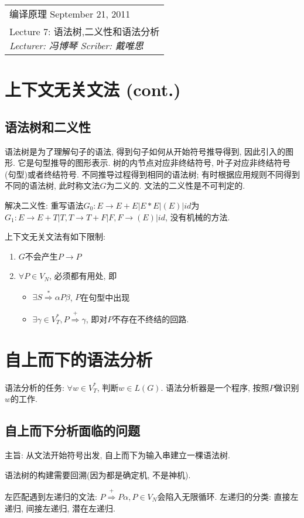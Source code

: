 \def\lecture{7}
\clearpage \noindent\begin{tabularx}{\linewidth}{|X|}
\hline \vskip -2mm
{\sf 编译原理} \hfill September 21, 2011 \\
{\centering \sf \large Lecture \lecture:
语法树,二义性和语法分析 \\ }
\textsl{Lecturer: 冯博琴 \hfill Scriber: 戴唯思}\\ \hline
\end{tabularx}
\setcounter{section}{0}
\renewcommand{\thepage}{\lecture -\arabic{page}}

\section{上下文无关文法 (cont.)}

    \subsection{语法树和二义性}

        \textsf{语法树}是为了理解句子的语法, 得到句子如何从开始符号推导得到, 因此引入的图形. 它是句型推导的图形表示. 树的内节点对应非终结符号, 叶子对应非终结符号(句型)或者终结符号. 不同推导过程得到相同的语法树; 有时根据应用规则不同得到不同的语法树, 此时称文法$G$为\textsf{二义的}. 文法的二义性是不可判定的.

        解决二义性: 重写语法$G_0:E\to E+E|E*E|(E)|id$为$G_1:E\to E+T|T, T\to T+F|F, F\to(E)|id$, 没有机械的方法.

        上下文无关文法有如下限制:

        \begin{enumerate}
            \item $G$不会产生$P\to P$
            \item $\forall P\in V_N$, 必须都有用处, 即
                \begin{itemize}
                    \item $\exists S\stackrel{*}{\Rightarrow} \alpha P\beta$, $P$在句型中出现
                    \item $\exists \gamma\in V_T^*, P\stackrel{+}{\Rightarrow}\gamma$, 即对$P$不存在不终结的回路.
                \end{itemize}
        \end{enumerate}

\section{自上而下的语法分析}

    语法分析的任务: $\forall w\in V_T^*$, 判断$w\in L(G)$. 语法分析器是一个程序, 按照$P$做识别$w$的工作.

    \subsection{自上而下分析面临的问题}

        主旨: 从文法开始符号出发, 自上而下为输入串建立一棵语法树. 

        语法树的构建需要回溯(因为都是确定机, 不是神机).

        左匹配遇到\textsf{左递归}的文法: $P\stackrel{+}{\Rightarrow}P\alpha, P\in V_N$会陷入无限循环. 左递归的分类: 直接左递归, 间接左递归, 潜在左递归.

